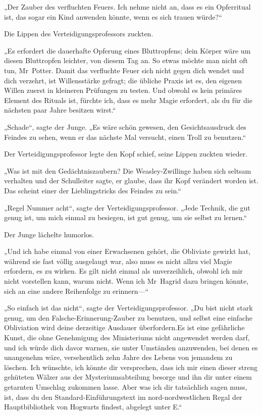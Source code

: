 {„Der Zauber des verfluchten Feuers. Ich nehme nicht an, dass es ein Opferritual ist, das sogar ein Kind anwenden könnte, wenn es sich trauen würde?“

Die Lippen des Verteidigungsprofessors zuckten.

„Es erfordert die dauerhafte Opferung eines Bluttropfens; dein Körper wäre um diesen Bluttropfen leichter, von diesem Tag an. So etwas möchte man nicht oft tun, Mr~Potter. Damit das verfluchte Feuer sich nicht gegen dich wendet und dich verzehrt, ist Willensstärke gefragt; die übliche Praxis ist es, den eigenen Willen zuerst in kleineren Prüfungen zu testen. Und obwohl es kein primäres Element des Rituals ist, fürchte ich, dass es mehr Magie erfordert, als du für die nächsten paar Jahre besitzen wirst.“

„Schade“, sagte der Junge. „Es wäre schön gewesen, den Gesichtsausdruck des Feindes zu sehen, wenn er das nächste Mal versucht, einen Troll zu benutzen.“

Der Verteidigungsprofessor legte den Kopf schief, seine Lippen zuckten wieder.

„Was ist mit den Gedächtniszaubern? Die Weasley-Zwillinge haben sich seltsam verhalten und der Schulleiter sagte, er glaube, dass ihr Kopf verändert worden ist. Das scheint einer der Lieblingstricks des Feindes zu sein.“

„Regel Nummer acht“, sagte der Verteidigungsprofessor. „Jede Technik, die gut genug ist, um mich einmal zu besiegen, ist gut genug, um sie selbst zu lernen.“

Der Junge lächelte humorlos.

„Und ich habe einmal von einer Erwachsenen gehört, die Obliviate gewirkt hat, während sie fast völlig ausgelaugt war, also muss es nicht allzu viel Magie erfordern, es zu wirken. Es gilt nicht einmal als unverzeihlich, obwohl ich mir nicht vorstellen kann, warum nicht. Wenn ich Mr~Hagrid dazu bringen könnte, sich an eine andere Reihenfolge zu erinnern—“

„So einfach ist das nicht“, sagte der Verteidigungsprofessor. „Du bist nicht stark genug, um den Falsche-Erinnerung-Zauber zu benutzen, und selbst eine einfache Obliviation wird deine derzeitige Ausdauer überfordern.Es ist eine gefährliche Kunst, die ohne Genehmigung des Ministeriums nicht angewendet werden darf, und ich würde dich davor warnen, sie unter Umständen anzuwenden, bei denen es unangenehm wäre, versehentlich zehn Jahre des Lebens von jemandem zu löschen. Ich wünschte, ich könnte dir versprechen, dass ich mir einen dieser streng gehüteten Wälzer aus der Mysteriumsabteilung besorge und ihn dir unter einem getarnten Umschlag zukommen lasse. Aber was ich dir tatsächlich sagen muss, ist, dass du den Standard-Einführungstext im nord-nordwestlichen Regal der Hauptbibliothek von Hogwarts findest, abgelegt unter E.“

}
